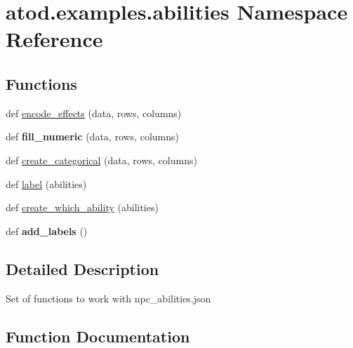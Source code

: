 \hypertarget{namespaceatod_1_1examples_1_1abilities}{}\section{atod.\+examples.\+abilities Namespace Reference}
\label{namespaceatod_1_1examples_1_1abilities}
\subsection*{Functions}
\begin{DoxyCompactItemize}
\item 
def \hyperlink{namespaceatod_1_1examples_1_1abilities_a40186ee91e473565c616dca6b2276a92}{encode\+\_\+effects} (data, rows, columns)
\item 
def {\bfseries fill\+\_\+numeric} (data, rows, columns)\hypertarget{namespaceatod_1_1examples_1_1abilities_ac290bacc2cce1e032eeb84879d2bb975}{}\label{namespaceatod_1_1examples_1_1abilities_ac290bacc2cce1e032eeb84879d2bb975}

\item 
def \hyperlink{namespaceatod_1_1examples_1_1abilities_a5aebe9d8368fd544f897787b98a51084}{create\+\_\+categorical} (data, rows, columns)
\item 
def \hyperlink{namespaceatod_1_1examples_1_1abilities_a88be7d6dc018665b6f26787784eaedb5}{label} (abilities)
\item 
def \hyperlink{namespaceatod_1_1examples_1_1abilities_a2885395057becca7d64cd579c17ba109}{create\+\_\+which\+\_\+ability} (abilities)
\item 
def {\bfseries add\+\_\+labels} ()\hypertarget{namespaceatod_1_1examples_1_1abilities_a69e1c36e67cf9e7601805295c366535d}{}\label{namespaceatod_1_1examples_1_1abilities_a69e1c36e67cf9e7601805295c366535d}

\end{DoxyCompactItemize}


\subsection{Detailed Description}
\begin{DoxyVerb}Set of functions to work with npc_abilities.json\end{DoxyVerb}
 

\subsection{Function Documentation}

